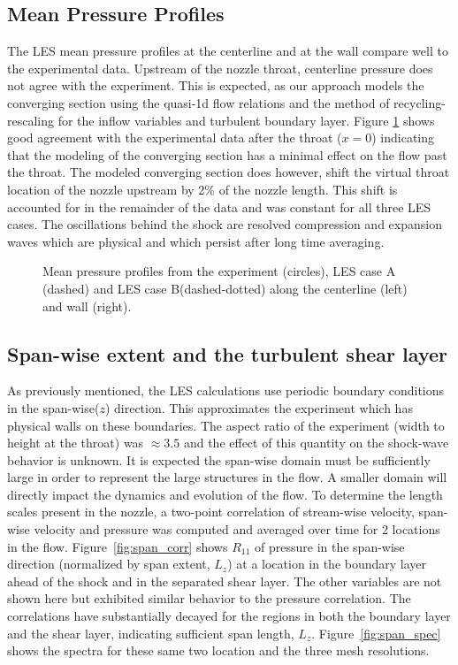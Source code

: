 \documentclass[]{aiaa-tc}%
\begin{document}
\clearpage
\subsection{Mean Pressure Profiles}
The LES mean pressure profiles at the centerline and at the wall compare well to the experimental data.  Upstream of the nozzle throat, centerline pressure does not agree with the experiment.  This is expected, as our approach models the converging section using the quasi-1d flow relations and the method of recycling-rescaling for the inflow variables and turbulent boundary layer.  Figure \ref{fig:P_prof} shows good agreement with the experimental data after the throat ($x=0$) indicating that the modeling of the converging section has a minimal effect on the flow past the throat.  The modeled converging section does however, shift the virtual throat location of the nozzle upstream by 2\% of the nozzle length.  This shift is accounted for in the remainder of the data and was constant for all three LES cases.  The oscillations behind the shock are resolved compression and expansion waves which are physical and which persist after long time averaging.

\begin{figure}[!ht]
	\caption{ Mean pressure profiles from the experiment (circles),  LES case A (dashed) and LES case B(dashed-dotted) along the centerline (left) and wall (right). 
	\label{fig:P_prof}
	}
\end{figure}


\subsection{Span-wise extent and the turbulent shear layer }
As previously mentioned, the LES calculations use periodic boundary conditions in the span-wise($z$) direction.  This approximates the experiment which has physical walls on these boundaries.  The aspect ratio of the experiment (width to height at the throat) was $\approx 3.5$ and the effect of this quantity on the shock-wave behavior is unknown.  It is expected the span-wise domain must be sufficiently large in order to represent the large structures in the flow.  A smaller domain will directly impact the dynamics and evolution of the flow.  To determine the length scales present in the nozzle, a two-point correlation of stream-wise velocity, span-wise velocity and pressure was computed and averaged over time for 2 locations in the flow.  Figure~\ref{fig:span_corr} shows $R_{11}$ of pressure in the span-wise direction (normalized by span extent, $L_z$) at a location in the boundary layer ahead of the shock and in the separated shear layer.  The other variables are not shown here but exhibited similar behavior to the pressure correlation.  The correlations have substantially decayed for the regions in both the boundary layer and the shear layer, indicating sufficient span length, $L_z$.  Figure~\ref{fig:span_spec} shows the spectra for these same two location and the three mesh resolutions.
\end{document}
